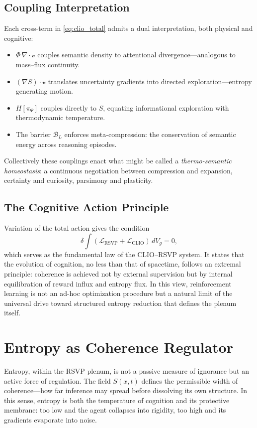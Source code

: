 \documentclass[11pt]{article}
\begin{document}
\subsection{Coupling Interpretation}

Each cross-term in \eqref{eq:clio_total} admits a dual interpretation, both physical and cognitive:

\begin{itemize}
  \item $\Phi\,\nabla\!\cdot\!\mathcal{v}$ couples semantic density to attentional divergence---analogous to mass–flux continuity.
  \item $(\nabla S)\!\cdot\!\mathcal{v}$ translates uncertainty gradients into directed exploration---entropy generating motion.
  \item $H[\pi_\Psi]$ couples directly to $S$, equating informational exploration with thermodynamic temperature.
  \item The barrier $\mathcal{B}_L$ enforces meta-compression: the conservation of semantic energy across reasoning episodes.
\end{itemize}

Collectively these couplings enact what might be called a \emph{thermo-semantic homeostasis}: a continuous negotiation between compression and expansion, certainty and curiosity, parsimony and plasticity.

\subsection{The Cognitive Action Principle}

Variation of the total action gives the condition
\[
\boxed{
\delta\!\int\!(\mathcal{L}_{\mathrm{RSVP}}+\mathcal{L}_{\mathrm{CLIO}})\,dV_g = 0,
}
\]
which serves as the fundamental law of the CLIO–RSVP system.  
It states that the evolution of cognition, no less than that of spacetime, follows an extremal principle: coherence is achieved not by external supervision but by internal equilibration of reward influx and entropy flux.  
In this view, reinforcement learning is not an ad-hoc optimization procedure but a natural limit of the universal drive toward structured entropy reduction that defines the plenum itself.

\section{Entropy as Coherence Regulator}
Entropy, within the RSVP plenum, is not a passive measure of ignorance but an active force of regulation.  
The field $S(x,t)$ defines the permissible width of coherence—how far inference may spread before dissolving its own structure.  
In this sense, entropy is both the temperature of cognition and its protective membrane: too low and the agent collapses into rigidity, too high and its gradients evaporate into noise.  
\end{document}
